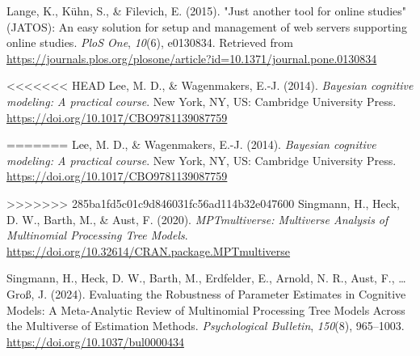 \documentclass[
  doc,floatsintext]{apa6}
\newlength{\cslhangindent}
\newenvironment{CSLReferences}[2] %
 {\begin{list}{}{%
  \setlength{\itemindent}{0pt}
  \setlength{\leftmargin}{0pt}
  \setlength{\parsep}{0pt}
  \ifodd #1
   \setlength{\leftmargin}{\cslhangindent}
   \setlength{\itemindent}{-1\cslhangindent}
  \fi
  \setlength{\itemsep}{#2\baselineskip}}}
 {\end{list}}
\begin{document}
\begin{CSLReferences}{1}{0}
Lange, K., Kühn, S., \& Filevich, E. (2015). "{Just} another tool for online studies" ({JATOS}): {An} easy solution for setup and management of web servers supporting online studies. \emph{PloS One}, \emph{10}(6), e0130834. Retrieved from \url{https://journals.plos.org/plosone/article?id=10.1371/journal.pone.0130834}

<<<<<<< HEAD
\leavevmode{}%
Lee, M. D., \& Wagenmakers, E.-J. (2014). \emph{Bayesian cognitive modeling: {A} practical course}. New York, NY, US: Cambridge University Press. \url{https://doi.org/10.1017/CBO9781139087759}

\leavevmode{}%
=======
Lee, M. D., \& Wagenmakers, E.-J. (2014). \emph{Bayesian cognitive modeling: {A} practical course}. New York, NY, US: Cambridge University Press. \url{https://doi.org/10.1017/CBO9781139087759}

>>>>>>> 285ba1fd5c01c9d846031fc56ad114b32e047600
Singmann, H., Heck, D. W., Barth, M., \& Aust, F. (2020). \emph{{MPTmultiverse}: {Multiverse Analysis} of {Multinomial Processing Tree Models}}. \url{https://doi.org/10.32614/CRAN.package.MPTmultiverse}

Singmann, H., Heck, D. W., Barth, M., Erdfelder, E., Arnold, N. R., Aust, F., \ldots{} Groß, J. (2024). Evaluating the {Robustness} of {Parameter Estimates} in {Cognitive Models}: {A Meta-Analytic Review} of {Multinomial Processing Tree Models Across} the {Multiverse} of {Estimation Methods}. \emph{Psychological Bulletin}, \emph{150}(8), 965--1003. \url{https://doi.org/10.1037/bul0000434}

\end{CSLReferences}
\end{document}
